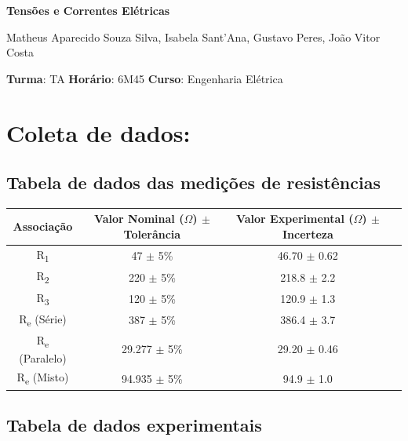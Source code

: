 \documentclass{article}
\begin{document}
\begin{center}
    \huge
    \textbf{Tensões e Correntes Elétricas}
    \normalsize
    \vspace{10pt}

    Matheus Aparecido Souza Silva, Isabela Sant'Ana, Gustavo Peres, João Vitor Costa
    \vspace{5pt}

    \textbf{Turma}: TA \quad \textbf{Horário}: 6M45 \quad \textbf{Curso}: Engenharia Elétrica

\section{Coleta de dados:}
\subsection{Tabela de dados das medições de resistências}

\begin{tabular}{|c|c|c|c|}
    \hline
    Associação & Valor Nominal (\(\Omega\)) $\pm$ Tolerância & Valor Experimental (\(\Omega\)) $\pm$ Incerteza \\
    \hline
    R\textsubscript{1} & 47 $\pm$ 5\% & 46.70 $\pm$ 0.62 \\
    \hline
    R\textsubscript{2} & 220 $\pm$ 5\% & 218.8 $\pm$ 2.2 \\
    \hline
    R\textsubscript{3} & 120 $\pm$ 5\% & 120.9 $\pm$ 1.3 \\
    \hline
    R\textsubscript{e} (Série) & 387 $\pm$ 5\% & 386.4 $\pm$ 3.7 \\
    \hline
    R\textsubscript{e} (Paralelo) & 29.277 $\pm$ 5\% & 29.20 $\pm$ 0.46 \\
    \hline
    R\textsubscript{e} (Misto) & 94.935 $\pm$ 5\% & 94.9 $\pm$ 1.0 \\
    \hline 
\end{tabular}

\subsection{Tabela de dados experimentais}


\end{center}
\end{document}
